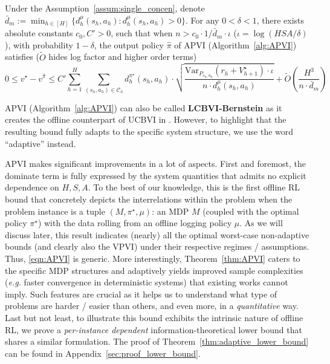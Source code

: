 \begin{theorem}\label{thm:APVI}
	Under the Assumption~\ref{assum:single_concen}, denote $\bar{d}_m:=\min_{h\in[H]}\{d^\mu_h(s_h,a_h):d^\mu_h(s_h,a_h)>0\}$. For any $0<\delta<1$, there exists absolute constants $c_0,C'>0$, such that when $n>c_0 \cdot 1/\bar{d}_m\cdot\iota$ ($\iota=\log(HSA/\delta)$), with probability $1-\delta$, the output policy $\widehat{\pi}$ of APVI (Algorithm~\ref{alg:APVI}) satisfies ($\widetilde{O}$ hides log factor and higher order terms)
	\begin{equation}\label{eqn:APVI}
	0\leq v^\star-v^{\widehat{\pi}}\leq C'\sum_{h=1}^H\sum_{(s_h,a_h)\in\mathcal{C}_h}d^{\pi^\star}_h(s_h,a_h)\cdot\sqrt{\frac{\mathrm{Var}_{P_{s_h,a_h}}(r_h+V^\star_{h+1})\cdot\iota}{ n\cdot d^\mu_h{(s_h,a_h)}}}+\widetilde{O}\left(\frac{H^3}{n\cdot \bar{d}_m}\right)
	\end{equation}
\end{theorem}
\begin{remark}
	APVI (Algorithm~\ref{alg:APVI}) can also be called \textbf{LCBVI-Bernstein} as it creates the offline counterpart of UCBVI in \cite{azar2017minimax}. However, to highlight that the resulting bound fully adapts to the specific system structure, we use the word ``adaptive'' instead.
\end{remark}


APVI makes significant improvements in a lot of aspects. First and foremost, the dominate term is fully expressed by the system quantities that admits no explicit dependence on $H,S,A$. To the best of our knowledge, this is the first offline RL bound that concretely depicts the interrelations within the problem when the problem instance is a tuple $(M,\pi^\star,\mu)$: an MDP $M$ (coupled with the optimal policy $\pi^\star$) with the data rolling from an offline logging policy $\mu$. As we will discuss later, this result indicates (nearly) all the optimal worst-case non-adaptive bounds (and clearly also the VPVI) under their respective regimes / assumptions. Thus, \eqref{eqn:APVI} is generic. More interestingly, Theorem~\ref{thm:APVI} caters to the specific MDP structures and adaptively yields improved sample complexities (\emph{e.g.} faster convergence in deterministic systems) that existing works cannot imply. Such features are crucial as it helps us to understand what type of problems are harder / easier than others, and even more, in a \emph{quantitative} way. Last but not least, to illustrate this bound exhibits the intrinsic nature of offline RL, we prove a \emph{per-instance dependent} information-theoretical lower bound that shares a similar formulation. The proof of Theorem~\ref{thm:adaptive_lower_bound} can be found in Appendix~\ref{sec:proof_lower_bound}. 


